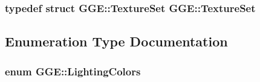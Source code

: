 \hypertarget{namespace_g_g_e_ac7a8b0e1f9b7fdd11002ac1259a61278}{
\subsubsection[{Texture\+Set}]{\setlength{\rightskip}{0pt plus 5cm}typedef struct {\bf G\+G\+E\+::\+Texture\+Set}  {\bf G\+G\+E\+::\+Texture\+Set}}}\label{namespace_g_g_e_ac7a8b0e1f9b7fdd11002ac1259a61278}


\subsection{Enumeration Type Documentation}
\hypertarget{namespace_g_g_e_ad1102da762de1f99e787ff6a9453ef73}{
\subsubsection[{Lighting\+Colors}]{\setlength{\rightskip}{0pt plus 5cm}enum {\bf G\+G\+E\+::\+Lighting\+Colors}}}\label{namespace_g_g_e_ad1102da762de1f99e787ff6a9453ef73}
